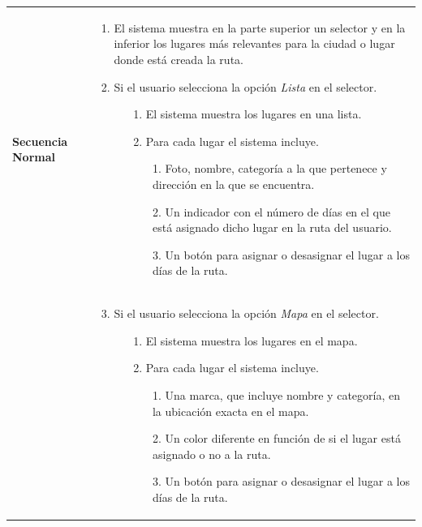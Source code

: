 \begin{longtable}{| p{4cm} | p{10cm} |}
\hline
\textbf{Secuencia Normal} &\mbox{}\par\vspace{-\baselineskip}
\begin{enumerate}[leftmargin=0.7cm, topsep=0.1cm]
\item El sistema muestra en la parte superior un selector y en la inferior los lugares más relevantes para la ciudad o lugar donde está creada la ruta.
\item Si el usuario selecciona la opción \textit{Lista} en el selector.
	\begin{itemize}
	\item[1.] El sistema muestra los lugares en una lista.
	\item[2.] Para cada lugar el sistema incluye.
		\begin{itemize}
		\item[1.] Foto, nombre, categoría a la que pertenece y dirección en la que se encuentra.
		\item[2.] Un indicador con el número de días en el que está asignado dicho lugar en la ruta del usuario.
		\item[3.] Un botón para asignar o desasignar el lugar a los días de la ruta.
		\end{itemize}
	\end{itemize}
\end{enumerate}
\\ &\mbox{}\par\vspace{-\baselineskip}	
\begin{enumerate}[leftmargin=0.7cm, topsep=0.1cm]
\setcounter{enumi}{2}
\item Si el usuario selecciona la opción \textit{Mapa} en el selector.
	\begin{itemize}
	\item[1.] El sistema muestra los lugares en el mapa.
	\item[2.] Para cada lugar el sistema incluye.
		\begin{itemize}
		\item[1.] Una marca, que incluye nombre y categoría, en la ubicación exacta en el mapa.
		\item[2.] Un color diferente en función de si el lugar está asignado o no a la ruta.
		\item[3.] Un botón para asignar o desasignar el lugar a los días de la ruta.
		\end{itemize}
	\end{itemize}
\end{enumerate}



\end{longtable}

